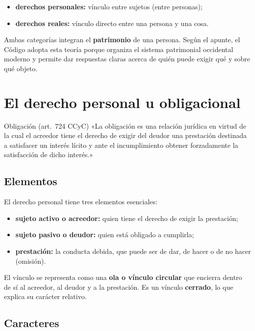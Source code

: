 \documentclass[12pt,oneside]{book}
\begin{document}
\begin{itemize}
    \item \textbf{derechos personales:} vínculo entre sujetos (entre personas);
    \item \textbf{derechos reales:} vínculo directo entre una persona y una cosa.
\end{itemize}

Ambas categorías integran el \textbf{patrimonio} de una persona. Según el apunte, el Código adopta esta teoría porque organiza el sistema patrimonial occidental moderno y permite dar respuestas claras acerca de quién puede exigir qué y sobre qué objeto.

\section{El derecho personal u obligacional}

\begin{definicion}{Obligación (art.~724 CCyC)}
«La obligación es una relación jurídica en virtud de la cual el acreedor tiene el derecho de exigir del deudor una prestación destinada a satisfacer un interés lícito y ante el incumplimiento obtener forzadamente la satisfacción de dicho interés.»
\end{definicion}

\subsection{Elementos}

El derecho personal tiene tres elementos esenciales:

\begin{itemize}
    \item \textbf{sujeto activo o acreedor:} quien tiene el derecho de exigir la prestación;
    \item \textbf{sujeto pasivo o deudor:} quien está obligado a cumplirla;
    \item \textbf{prestación:} la conducta debida, que puede ser de dar, de hacer o de no hacer (omisión).
\end{itemize}

El vínculo se representa como una \textbf{ola o vínculo circular} que encierra dentro de sí al acreedor, al deudor y a la prestación. Es un vínculo \textbf{cerrado}, lo que explica su carácter relativo.

\subsection{Caracteres}
\end{document}
